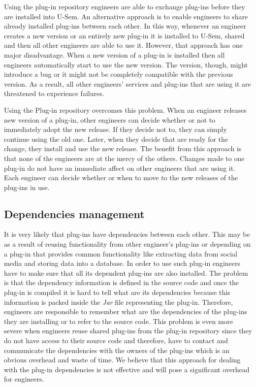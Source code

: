 Using the plug-in repository engineers are able to exchange plug-ins before they are installed into U-Sem. An alternative approach is to enable engineers to share already installed plug-ins between each other. In this way, whenever an engineer creates a new version or an entirely new plug-in it is installed to U-Sem, shared and then all other engineers are able to use it. However, that approach has one major disadvantage. When a new version of a plug-in is installed then all engineers automatically start to use the new version. The version, though, might introduce a bug or it might not be completely compatible with the previous version. As a result, all other engineers' services and plug-ins that are using it are threatened to experience failures. 

Using the Plug-in repository overcomes this problem. When an engineer releases new version of a plug-in, other engineers can decide whether or not to immediately adopt the new release. If they decide not to, they can simply continue using the old one. Later, when they decide that are ready for the change, they install and use the new release. The benefit from this approach is that none of the engineers are at the mercy of the others. Changes made to one plug-in do not have an immediate affect on other engineers that are using it. Each engineer can decide whether or when to move to the new releases of the plug-ins in use.

\subsection{Dependencies management}

It is very likely that plug-ins have dependencies between each other. This may be as a result of reusing functionality from other engineer's plug-ins or depending on a plug-in that provides common functionality like extracting data from social media and storing data into a database. In order to use such plug-in engineers have to make sure that all its dependent plug-ins are also installed. The problem is that the dependency information is defined in the source code and once the plug-in is compiled it is hard to tell what are its dependencies because this information is packed inside the \textit{Jar} file representing the plug-in. Therefore, engineers are responsible to remember what are the dependencies of the plug-ins they are installing or to refer to the source code. This problem is even more severe when engineers reuse shared plug-ins from the plug-in repository since they do not have access to their source code and therefore, have to contact and communicate the dependencies with the owners of the plug-ins which is an obvious overhead and waste of time. We believe that this approach for dealing with the plug-in dependencies is not effective and will pose a significant overhead for engineers.

